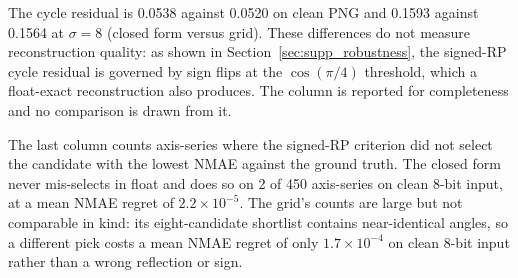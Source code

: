 \documentclass[10pt,a4paper,parskip=half-]{scrartcl}
\begin{document}
The cycle residual is 0.0538 against 0.0520 on clean PNG and 0.1593 against 0.1564 at $\sigma=8$ (closed form versus grid). These differences do not measure reconstruction quality: as shown in Section~\ref{sec:supp_robustness}, the signed-RP cycle residual is governed by sign flips at the $\cos(\pi/4)$ threshold, which a float-exact reconstruction also produces. The column is reported for completeness and no comparison is drawn from it.

The last column counts axis-series where the signed-RP criterion did not select the candidate with the lowest NMAE against the ground truth. The closed form never mis-selects in float and does so on 2 of 450 axis-series on clean 8-bit input, at a mean NMAE regret of $2.2\times10^{-5}$. The grid's counts are large but not comparable in kind: its eight-candidate shortlist contains near-identical angles, so a different pick costs a mean NMAE regret of only $1.7\times10^{-4}$ on clean 8-bit input rather than a wrong reflection or sign.
\end{document}
